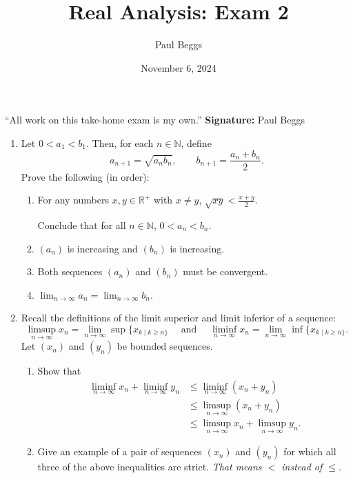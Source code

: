 \documentclass[12pt]{article}
\title{Real Analysis: Exam 2}
\author{Paul Beggs}
\date{November 6, 2024}
\newcommand{\limn}[1]{\ensuremath{\lim_{n \rightarrow \infty}}#1}
\newcommand{\limsupn}[1]{\displaystyle\limsup_{n\rightarrow \infty}#1}
\newcommand{\liminfn}[1]{\displaystyle\liminf_{n\rightarrow \infty}#1}
\newcommand{\N}{\ensuremath{\mathbb{N}}}
\newcommand{\R}{\ensuremath{\mathbb{R}}}
\begin{document}
\maketitle

``All work on this take-home exam is my own.'' \hfill \textbf{Signature:} Paul Beggs

\vspace{0.5cm}

\begin{enumerate}
    \item Let \( 0 < a_{1} < b_{1}\). Then, for each \(n \in \N\), define
          \[
              a_{n + 1} = \sqrt{a_{n}b_{n}}, \qquad b_{n + 1} = \frac{a_{n} + b_{n}}{2}.
          \]
          Prove the following (in order):
          \begin{enumerate}
              \item For any numbers \(x,y \in \R^{+}\) with \(x \ne y\), \(\displaystyle \sqrt{xy} < \frac{x + y}{2}\).

                    Conclude that for all \(n \in \N\), \(0 < a_{n} < b_{n}\).
              \item \((a_{n})\) is increasing and \((b_{n})\) is increasing.
              \item Both sequences \((a_{n})\) and \((b_{n})\) must be convergent.
              \item \(\limn a_{n} = \limn b_{n}\).
          \end{enumerate}
    \item Recall the definitions of the limit superior and limit inferior of a sequence:
          \[
              \limsupn{x_{n}} = \limn \sup\{x_{k \mid k \geq n\}} \quad \text{ and }\quad  \liminfn{x_{n}} = \limn \inf \{x_{k \mid k \geq n\}}.
          \]
          Let \((x_{n})\) and \((y_{n})\) be bounded sequences.
          \begin{enumerate}
              \item Show that \begin{align*}
                        \liminfn{x_{n}} + \liminfn{y_{n}} & \leq \liminfn{(x_{n} + y_{n})}          \\
                                                          & \leq \limsupn{(x_{n} + y_{n})}          \\
                                                          & \leq \limsupn{x_{n}} + \limsupn{y_{n}}.
                    \end{align*}
              \item Give an example of a pair of sequences \((x_{n})\) and \((y_{n})\) for which all three of the above inequalities are strict. \textit{That means \(<\) instead of \(\leq\)}.
          \end{enumerate}
\end{enumerate}
\end{document}
